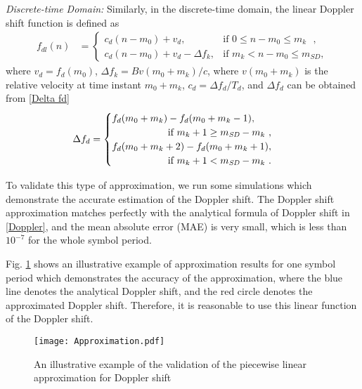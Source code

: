 \documentclass{IEEEtaes}
\theoremstyle{plain}
\begin{document}
\textit{Discrete-time Domain:}
Similarly, in the discrete-time domain, the linear Doppler shift function is defined as
\begin{equation}
  \label{approximation-dis}
  \begin{aligned} 
    f_{dl}(n)  & \!=\!\begin{cases}
      c_d (n\!-\!m_0)\!+\! v_d, &\text{if $0\!\le\! n\!-\!m_0 \!\le\! m_k$ },\\
      c_d (n\!-\!m_0)\!+\! v_d \!-\!\Delta f_k, & \text{if $m_k \!<\! n\!-\!m_0 \!\le\! m_{\textit{SD}}$},
    \end{cases}
  \end{aligned}
\end{equation}
where $v_d = f_d(m_0)$, $\Delta f_k = Bv(m_0+m_k)/c$, where $v(m_0+m_k)$ is the relative velocity at time instant $m_0+m_k$, $c_d = \Delta f_d / T_d$, and $\Delta f_d $ can be obtained from \eqref{Delta fd}
\begin{equation}
  \label{Delta fd}
  \begin{aligned} 
    \Delta f_d  & =\begin{cases}
      f_d(m_0+m_k)-f_d(m_0+m_k-1), \\
\hfill \text{ if $m_k+1 \geq m_{\textit{SD}}-m_k$ },\\
      f_d(m_0+m_k+2)-f_d(m_0+m_k+1),\\
\hfill \text{ if $m_k+1 < m_{\textit{SD}}-m_k$ }. 
    \end{cases}
  \end{aligned}
\end{equation}

To validate this type of approximation, we run some simulations which demonstrate the accurate estimation of the Doppler shift. The Doppler shift approximation matches perfectly with the analytical formula of Doppler shift in \eqref{Doppler}, and the mean absolute error (MAE) is very small, which is less than  $10^{-7}$ for the whole symbol period. 

Fig. \ref{approximation} shows an illustrative example of approximation results for one symbol period which demonstrates the accuracy of the approximation, where the blue line denotes the analytical Doppler shift, and the red circle denotes the approximated Doppler shift. 
Therefore, it is reasonable to use this linear function of the Doppler shift.
\begin{figure}[ht]
  \centering
  \texttt{[image: Approximation.pdf]}
  \caption{An illustrative example of the validation of the piecewise linear approximation for Doppler shift%
  }
  \label{approximation}
\end{figure}
\vspace{-1pt}
\end{document}
